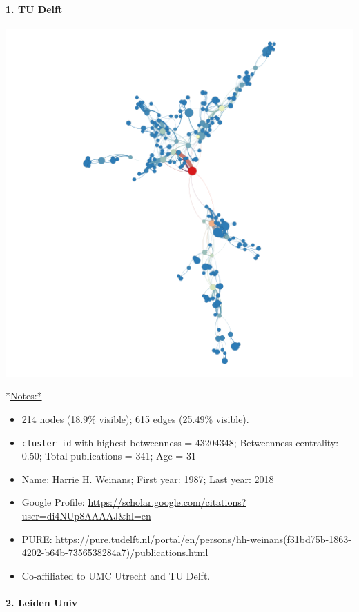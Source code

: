 \documentclass[]{article}
\providecommand{\tightlist}{%
  \setlength{\itemsep}{0pt}\setlength{\parskip}{0pt}}
\let\oldparagraph\paragraph
\renewcommand{\paragraph}[1]{\oldparagraph{#1}\mbox{}}
\begin{document}
\paragraph{1. TU Delft}\label{tu-delft-1}

\includegraphics{figs/tu_bio_betweenness.png}

*\url{Notes:*}

\begin{itemize}
\tightlist
\item
  214 nodes (18.9\% visible); 615 edges (25.49\% visible).
\item
  \texttt{cluster\_id} with highest betweenness = 43204348; Betweenness
  centrality: 0.50; Total publications = 341; Age = 31
\item
  Name: Harrie H. Weinans; First year: 1987; Last year: 2018
\item
  Google Profile:
  \url{https://scholar.google.com/citations?user=di4NUp8AAAAJ\&hl=en}
\item
  PURE:
  \url{https://pure.tudelft.nl/portal/en/persons/hh-weinans(f31bd75b-1863-4202-b64b-7356538284a7)/publications.html}
\item
  Co-affiliated to UMC Utrecht and TU Delft.
\end{itemize}

\paragraph{2. Leiden Univ}\label{leiden-univ-1}
\end{document}

